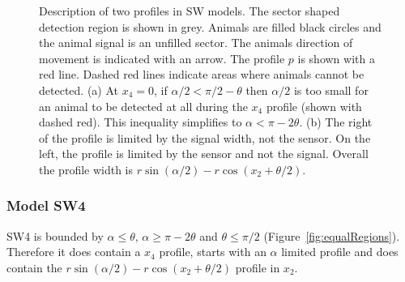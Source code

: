 \begin{figure}[t]
 \centering
{
}
\caption[Description of two profiles in SW models]{
Description of two profiles in SW models.
The sector shaped detection region is shown in grey.
Animals are filled black circles and the animal signal is an unfilled sector.
The animals direction of movement is indicated with an arrow.
The profile $p$ is shown with a red line.
Dashed red lines indicate areas where animals cannot be detected.
(a) At $x_4 = 0$, if $\alpha/2 < \pi/2 - \theta$ then $\alpha/2$ is too small for an animal to be detected at all during the $x_4$ profile (shown with dashed red).
This inequality simplifies to $\alpha < \pi - 2\theta$.
(b) The right of the profile is limited by the signal width, not the sensor.
On the left, the profile is limited by the sensor and not the signal.
Overall the profile width is $r\sin(\alpha/2) - r\cos(x_2 + \theta/2)$.
}
\label{fig:SW4--9}
\end{figure}

\subsubsection{Model SW4} \label{SW4}

SW4 is bounded by $\alpha \le \theta$, $\alpha \ge \pi - 2\theta$ and $\theta \le \pi/2$ (Figure~\ref{fig:equalRegions}).
Therefore it does contain a $x_4$ profile, starts with an $\alpha$ limited profile and does contain the $r\sin(\alpha/2) - r\cos(x_2 + \theta/2)$ profile in $x_2$.

